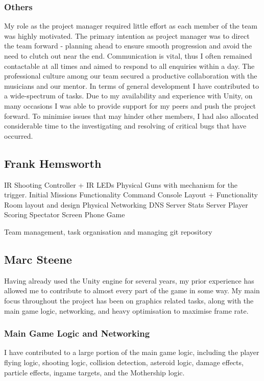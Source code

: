\documentclass[a4paper,11pt]{article}
\begin{document}

\subsubsection{Others}

My role as the project manager required little effort as each member of the team was highly motivated. The primary intention as project manager was to direct the team forward - planning ahead to ensure smooth progression and avoid the need to clutch out near the end. Communication is vital, thus I often remained contactable at all times and aimed to respond to all enquiries within a day. The professional culture among our team secured a productive collaboration with the musicians and our mentor. In terms of general development I have contributed to a wide-spectrum of tasks. Due to my availability and experience with Unity, on many occasions I was able to provide support for my peers and push the project forward. To minimise issues that may hinder other members, I had also allocated considerable time to the investigating and resolving of critical bugs that have occurred.

\clearpage

\subsection{Frank Hemsworth}

IR Shooting Controller + IR LEDs
Physical Guns with mechanism for the trigger.
Initial Missions Functionality
Command Console Layout + Functionality
Room layout and design
Physical Networking
DNS Server
Stats Server
Player Scoring
Spectator Screen
Phone Game

Team management, task organisation and managing git repository

\clearpage

\subsection{Marc Steene}
Having already used the Unity engine for several years, my prior experience has allowed me to contribute to almost every part of the game in some way. My main focus throughout the project has been on graphics related tasks, along with the main game logic, networking, and heavy optimisation to maximise frame rate.

\subsubsection{Main Game Logic and Networking}
I have contributed to a large portion of the main game logic, including the player flying logic, shooting logic, collision detection, asteroid logic, damage effects, particle effects, ingame targets, and the Mothership logic.
\end{document}
